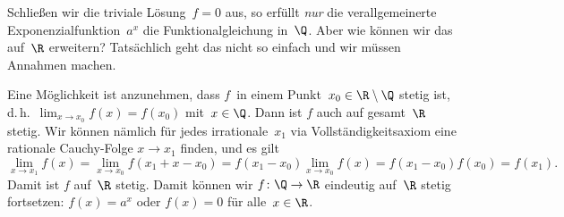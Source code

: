 \documentclass[a4paper]{article}
\begin{document}
Schließen wir die triviale Lösung~$f = 0$ aus, so erfüllt \emph{nur} die verallgemeinerte Exponenzialfunktion~$a^x$ die Funktionalgleichung in~$\Q$. Aber wie können wir das auf~$\R$ erweitern? Tatsächlich geht das nicht so einfach und wir müssen Annahmen machen.

Eine Möglichkeit ist anzunehmen, dass $f$~in einem Punkt~$x_0 \in \R\setminus\Q$ stetig ist, d.\,h.\ $\lim_{x\to x_0} f(x) = f(x_0)$ mit~$x \in \Q$. Dann ist $f$ auch auf gesamt~$\R$ stetig. Wir können nämlich für jedes irrationale~$x_1$ via Vollständigkeitsaxiom eine rationale Cauchy-Folge $x \to x_1$ finden, und es gilt
\begin{equation*}
    \lim_{x\to x_1} f(x) = \lim_{x\to x_0} f(x_1+x-x_0) = f(x_1-x_0) \lim_{x\to x_0} f(x) = f(x_1-x_0)f(x_0) = f(x_1).
\end{equation*}
Damit ist $f$ auf~$\R$ stetig. Damit können wir $f\colon \Q \to \R$ eindeutig auf~$\R$ stetig fortsetzen: $f(x) = a^x$ oder $f(x) = 0$ für alle~$x \in \R$.
\end{document}
